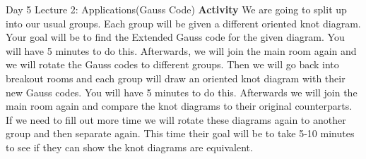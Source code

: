 \documentclass{article}
\begin{document}
\begin{section}{Day 5 Lecture 2: Applications(Gauss Code)}
\textbf{Activity} We are going to split up into our usual groups. Each group will be given a different oriented knot diagram. Your goal will be to find the Extended Gauss code for the given diagram. You will have 5 minutes to do this. Afterwards, we will join the main room again and we will rotate the Gauss codes to different groups. Then we will go back into breakout rooms and each group will draw an oriented knot diagram with their new Gauss codes. You will have 5 minutes to do this. Afterwards we will join the main room again and compare the knot diagrams to their original counterparts. If we need to fill out more time we will rotate these diagrams again to another group and then separate again. This time their goal will be to take 5-10 minutes to see if they can show the knot diagrams are equivalent.

\end{section}
\end{document}
